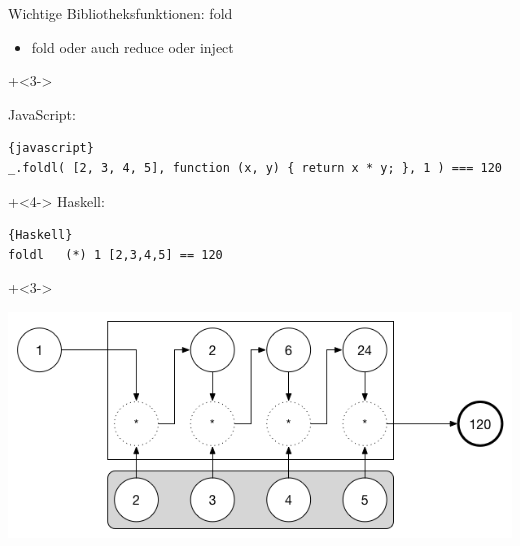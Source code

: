 \begin{frame}[fragile]{Wichtige Bibliotheksfunktionen: fold}
\begin{itemize}
\item fold oder auch reduce oder inject
\end{itemize}

\onslide+<3->

JavaScript:
\begin{lstlisting}{javascript}
_.foldl( [2, 3, 4, 5], function (x, y) { return x * y; }, 1 ) === 120
\end{lstlisting}
\onslide+<4->
Haskell:
\begin{lstlisting}{Haskell}
foldl	(*) 1 [2,3,4,5] == 120
\end{lstlisting}

\onslide+<3->
\begin{center}
\includegraphics[width=.7\framewidth]{fold_1.png}
\end{center}

\end{frame}

